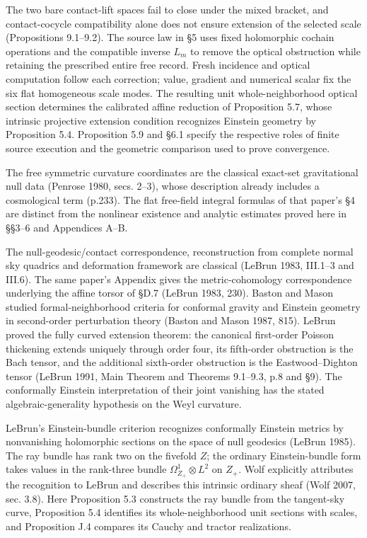 \documentclass[
  english,
  11pt,
  reqno]{amsart}
\begin{document}
The two bare contact-lift spaces fail to close under the mixed bracket,
and contact-cocycle compatibility alone does not ensure extension of the
selected scale (Propositions 9.1--9.2). The source law in §5 uses fixed
holomorphic cochain operations and the compatible inverse \(L_m\) to
remove the optical obstruction while retaining the prescribed entire
free record. Fresh incidence and optical computation follow each
correction; value, gradient and numerical scalar fix the six flat
homogeneous scale modes. The resulting unit whole-neighborhood optical
section determines the calibrated affine reduction of Proposition 5.7,
whose intrinsic projective extension condition recognizes Einstein
geometry by Proposition 5.4. Proposition 5.9 and §6.1 specify the
respective roles of finite source execution and the geometric comparison
used to prove convergence.

The free symmetric curvature coordinates are the classical exact-set
gravitational null data (Penrose 1980, secs. 2--3), whose description
already includes a cosmological term (p.233). The flat free-field
integral formulas of that paper's §4 are distinct from the nonlinear
existence and analytic estimates proved here in §§3--6 and Appendices
A--B.

The null-geodesic/contact correspondence, reconstruction from complete
normal sky quadrics and deformation framework are classical (LeBrun
1983, III.1--3 and III.6). The same paper's Appendix gives the
metric-cohomology correspondence underlying the affine torsor of §D.7
(LeBrun 1983, 230). Baston and Mason studied formal-neighborhood
criteria for conformal gravity and Einstein geometry in second-order
perturbation theory (Baston and Mason 1987, 815). LeBrun proved the
fully curved extension theorem: the canonical first-order Poisson
thickening extends uniquely through order four, its fifth-order
obstruction is the Bach tensor, and the additional sixth-order
obstruction is the Eastwood--Dighton tensor (LeBrun 1991, Main Theorem
and Theorems 9.1--9.3, p.8 and §9). The conformally Einstein
interpretation of their joint vanishing has the stated
algebraic-generality hypothesis on the Weyl curvature.

LeBrun's Einstein-bundle criterion recognizes conformally Einstein
metrics by nonvanishing holomorphic sections on the space of null
geodesics (LeBrun 1985). The ray bundle has rank two on the fivefold
\(Z\); the ordinary Einstein-bundle form takes values in the rank-three
bundle \(\Omega^1_{Z_+}\otimes L^2\) on \(Z_+\). Wolf explicitly
attributes the recognition to LeBrun and describes this intrinsic
ordinary sheaf (Wolf 2007, sec. 3.8). Here Proposition 5.3 constructs
the ray bundle from the tangent-sky curve, Proposition 5.4 identifies
its whole-neighborhood unit sections with scales, and Proposition J.4
compares its Cauchy and tractor realizations.
\end{document}

